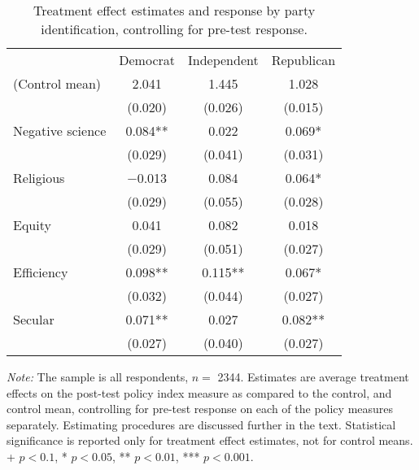 \begin{table*}

\caption{\label{tab:unnamed-chunk-20}Treatment effect estimates and response by party identification, controlling for pre-test response.\label{tab:party_lin}}
\centering
\begin{threeparttable}
\begin{tabular}[t]{lccc}
\toprule
  & Democrat & Independent & Republican\\
\cmidrule(lr){2-2} \cmidrule(lr){3-3} \cmidrule(lr){4-4}
(Control mean) & \num{2.041} & \num{1.445} & \num{1.028}\\
 & (\num{0.020}) & (\num{0.026}) & (\num{0.015})\\
Negative science & \num{0.084}** & \num{0.022} & \num{0.069}*\\
 & (\num{0.029}) & (\num{0.041}) & (\num{0.031})\\
Religious & \num{-0.013} & \num{0.084} & \num{0.064}*\\
 & (\num{0.029}) & (\num{0.055}) & (\num{0.028})\\
Equity & \num{0.041} & \num{0.082} & \num{0.018}\\
 & (\num{0.029}) & (\num{0.051}) & (\num{0.027})\\
Efficiency & \num{0.098}** & \num{0.115}** & \num{0.067}*\\
 & (\num{0.032}) & (\num{0.044}) & (\num{0.027})\\
Secular & \num{0.071}** & \num{0.027} & \num{0.082}**\\
 & (\num{0.027}) & (\num{0.040}) & (\num{0.027})\\
\bottomrule
\end{tabular}
\begin{tablenotes}
\item \footnotesize \textit{Note:} The sample is all respondents, $n = $ \num{2344}. Estimates are average treatment effects on the post-test policy index measure as compared to the control, and control mean, controlling for pre-test response on each of the policy measures separately. Estimating procedures are discussed further in the text. Statistical significance is reported only for treatment effect estimates, not for control means. + $p < 0.1$, * $p < 0.05$, ** $p < 0.01$, *** $p < 0.001$.
\end{tablenotes}
\end{threeparttable}
\end{table*}
